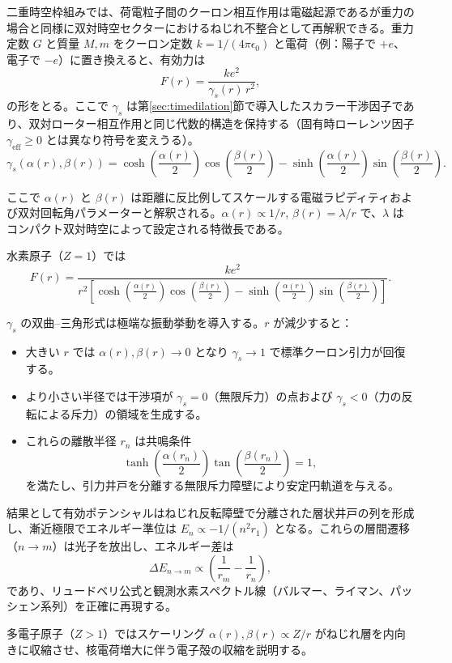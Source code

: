 \documentclass[a4paper]{article}
\begin{document}
二重時空枠組みでは、荷電粒子間のクーロン相互作用は電磁起源であるが重力の場合と同様に双対時空セクターにおけるねじれ不整合として再解釈できる。重力定数 $G$ と質量 $M,m$ をクーロン定数 $k = 1/(4\pi\epsilon_0)$ と電荷（例：陽子で $+e$、電子で $-e$）に置き換えると、有効力は
\[
F(r) = \frac{k e^2}{\gamma_s(r)\, r^2},
\]
の形をとる。ここで $\gamma_s$ は第\ref{sec:timedilation}節で導入したスカラー干渉因子であり、双対ローター相互作用と同じ代数的構造を保持する（固有時ローレンツ因子 $\gamma_\text{eff} \geq 0$ とは異なり符号を変えうる）。
\[
\gamma_s(\alpha(r),\beta(r)) = \cosh\!\left(\frac{\alpha(r)}{2}\right) \cos\!\left(\frac{\beta(r)}{2}\right) - \sinh\!\left(\frac{\alpha(r)}{2}\right) \sin\!\left(\frac{\beta(r)}{2}\right).
\]

ここで $\alpha(r)$ と $\beta(r)$ は距離に反比例してスケールする電磁ラピディティおよび双対回転角パラメーターと解釈される。$\alpha(r) \propto 1/r$, $\beta(r) = \lambda / r$ で、$\lambda$ はコンパクト双対時空によって設定される特徴長である。

水素原子（$Z=1$）では
\[
F(r) = \frac{k e^2}{r^2 \left[ \cosh\!\left(\frac{\alpha(r)}{2}\right) \cos\!\left(\frac{\beta(r)}{2}\right) - \sinh\!\left(\frac{\alpha(r)}{2}\right) \sin\!\left(\frac{\beta(r)}{2}\right) \right]}.
\]

$\gamma_s$ の双曲--三角形式は極端な振動挙動を導入する。$r$ が減少すると：

\begin{itemize}
  \item 大きい $r$ では $\alpha(r),\beta(r) \to 0$ となり $\gamma_s \to 1$ で標準クーロン引力が回復する。
  \item より小さい半径では干渉項が $\gamma_s = 0$（無限斥力）の点および $\gamma_s < 0$（力の反転による斥力）の領域を生成する。
  \item これらの離散半径 $r_n$ は共鳴条件
  \[
  \tanh\!\left(\frac{\alpha(r_n)}{2}\right) \tan\!\left(\frac{\beta(r_n)}{2}\right) = 1,
  \]
  を満たし、引力井戸を分離する無限斥力障壁により安定円軌道を与える。
\end{itemize}

結果として有効ポテンシャルはねじれ反転障壁で分離された層状井戸の列を形成し、漸近極限でエネルギー準位は $E_n \propto -1/(n^2 r_1)$ となる。これらの層間遷移（$n \to m$）は光子を放出し、エネルギー差は
\[
\Delta E_{n \to m} \propto \left( \frac{1}{r_m} - \frac{1}{r_n} \right),
\]
であり、リュードベリ公式と観測水素スペクトル線（バルマー、ライマン、パッシェン系列）を正確に再現する。

多電子原子（$Z > 1$）ではスケーリング $\alpha(r),\beta(r) \propto Z/r$ がねじれ層を内向きに収縮させ、核電荷増大に伴う電子殻の収縮を説明する。
\end{document}
